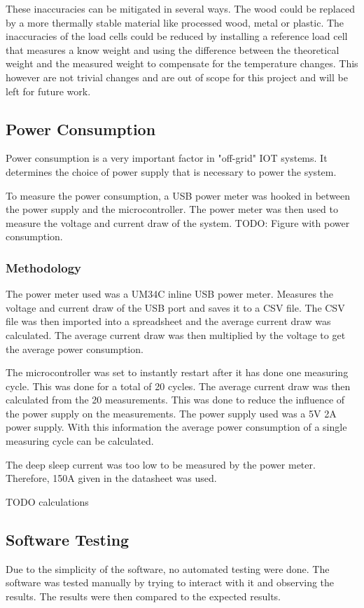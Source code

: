 These inaccuracies can be mitigated in several ways. The wood could be replaced by a more thermally stable material like processed wood, metal or plastic. The inaccuracies of the load cells could be reduced by installing a reference load cell that measures a know weight and using the difference between the theoretical weight and the measured weight to compensate for the temperature changes. This however are not trivial changes and are out of scope for this project and will be left for future work.

\subsection{Power Consumption}
Power consumption is a very important factor in "off-grid" IOT systems. It determines the choice of power supply that is necessary to power the system.

To measure the power consumption, a USB power meter was hooked in between the power supply and the microcontroller. The power meter was then used to measure the voltage and current draw of the system. TODO: Figure with power consumption.

\subsubsection{Methodology}
The power meter used was a UM34C inline USB power meter. Measures the voltage and current draw of the USB port and saves it to a CSV file. The CSV file was then imported into a spreadsheet and the average current draw was calculated. The average current draw was then multiplied by the voltage to get the average power consumption.

The microcontroller was set to instantly restart after it has done one measuring cycle. This was done for a total of 20 cycles. The average current draw was then calculated from the 20 measurements. This was done to reduce the influence of the power supply on the measurements. The power supply used was a 5V 2A power supply. With this information the average power consumption of a single measuring cycle can be calculated.

The deep sleep current was too low to be measured by the power meter. Therefore, 150\mu A given in the datasheet \cite{espressif_esp32} was used. 

TODO calculations



\subsection{Software Testing}
Due to the simplicity of the software, no automated testing were done. The software was tested manually by trying to interact with it and observing the results. The results were then compared to the expected results.

